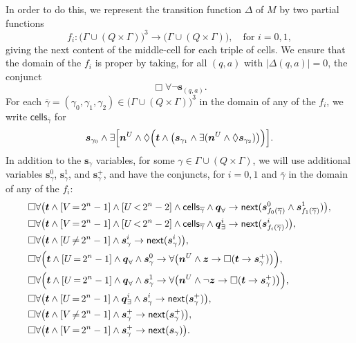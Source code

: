\documentclass{lmcs} %
\theoremstyle{plain}\newtheorem{satz}[thm]{Satz} %
\newcommand{\fform}[1]{\boldsymbol{#1}}
\newcommand{\qvar}{\fform{q}}
\newcommand{\svar}{\fform{s}}
\newcommand{\Zvar}{\fform{z}}
\newcommand{\cell}{\mathsf{cells}}
\newcommand{\cU}{U}
\newcommand{\cV}{V}
\newcommand{\cvf}[3]{[{#1}\mathop{#2}{#3}]}
\newcommand{\inpww}{a}
\newcommand{\nextU}{\fform{n}^\cU}
\newcommand{\Bv}{\forall}
\newcommand{\Bh}{\Box}
\newcommand{\Dv}{\exists}
\newcommand{\Dh}{\Diamond}
\newcommand{\nextt}[1]{\mathsf{next}({#1})}
\newcommand{\tree}{\fform{t}}
\newcommand{\qA}{\qvar_\forall}
\newcommand{\qE}{\qvar_\exists}
\begin{document}
	In order to do this, we represent the transition function $\Delta$ of $M$
	by two partial functions
	\[
	f_i \colon\bigl(\Gamma\cup(Q\times\Gamma)\bigr)^3\to\bigl(\Gamma\cup(Q\times\Gamma)\bigr),\quad\mbox{for $i=0,1$},
	\] 
	giving the next content of the middle-cell for each triple of cells. 
	We ensure that the domain of the $f_i$ is proper by taking, for all $(q,\inpww)$ with $|\Delta(q,\inpww)|=0$, the conjunct
	\begin{equation}
		\label{accept}
		\Bh\Bv\neg\svar_{(q,\inpww)}.
	\end{equation}
	For each $\overline{\gamma}=(\gamma_0,\gamma_1,\gamma_2)\in \bigl(\Gamma\cup(Q\times\Gamma)\bigr)^3$ in the domain of any of the $f_i$, we write $\cell_{\overline{\gamma}}$ for
	\[
	\svar_{\gamma_0}\land\Dv\Bigl[\nextU\land\Dh\Bigl(\tree\land\bigl(\svar_{\gamma_1}\land\Dv(\nextU\land\Dh\svar_{\gamma_2})\bigr)\Bigr)\Bigr].
	\]
	In addition to the $\svar_\gamma$ variables,
	for some
	$\gamma\in\Gamma\cup(Q\times\Gamma)$, we will use
	additional variables $\svar_\gamma^0$, $\svar_\gamma^1$, and $\svar_\gamma^+$, and have the conjuncts,
	for $i=0,1$ and $\overline{\gamma}$ in the domain of any of the $f_i$:
	\begin{align}
		& \Bh\Bv\bigl(\tree\land\cvf{\cV}{=}{2^n-1}\land\cvf{\cU}{<}{2^n-2}\land\cell_{\overline{\gamma}}\land\qA 
		\to\nextt{\svar^0_{f_0(\overline{\gamma})}\land \svar^1_{f_1(\overline{\gamma})}}\bigr),\\
		& \Bh\Bv\bigl(\tree\land\cvf{\cV}{=}{2^n-1}\land\cvf{\cU}{<}{2^n-2}\land\cell_{\overline{\gamma}}\land\qE^i 
		\to\nextt{\svar^i_{f_i(\overline{\gamma})}}\bigr),\\
		& \Bh\Bv\bigl(\tree\land\cvf{\cU}{\ne}{2^n-1}\land\svar_\gamma^i\to\nextt{\svar_\gamma^i}\bigr),\\
		& \Bh\Bv\Bigl(\tree\land\cvf{\cU}{=}{2^n-1}\land\qA\land\svar_\gamma^0\to 
		\Bv\bigl(\nextU\land\Zvar\to\Bh(\tree\to\svar_\gamma^+)\bigr)\Bigr),\\
		& \Bh\Bv\Bigl(\tree\land\cvf{\cU}{=}{2^n-1}\land\qA\land\svar_\gamma^1\to 
		\Bv\bigl(\nextU\land\neg\Zvar\to\Bh(\tree\to\svar_\gamma^+)\bigr)\Bigr),\\
		& \Bh\Bv\bigl(\tree\land\cvf{\cU}{=}{2^n-1}\land\qE^i\land\svar_\gamma^i\to
		\nextt{\svar_\gamma^+}\bigr),\\
		& \Bh\Bv\bigl(\tree\land\cvf{\cV}{\ne}{2^n-1}\land\svar_\gamma^+\to
		\nextt{\svar_\gamma^+}\bigr),\\
		\label{treelast}
		& \Bh\Bv\bigl(\tree\land\cvf{\cV}{=}{2^n-1}\land\svar_\gamma^+\to
		\nextt{\svar_\gamma}\bigr).
	\end{align}
\end{document}
